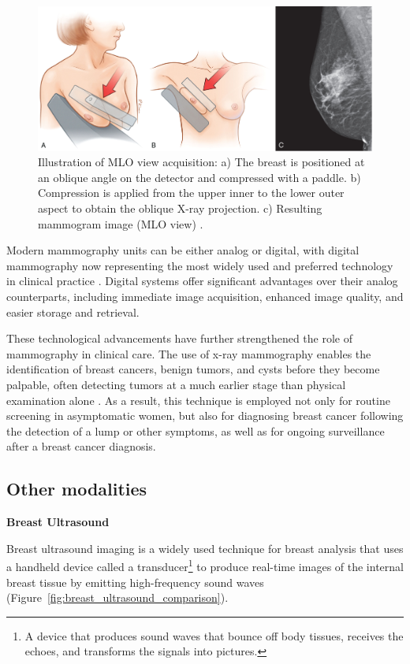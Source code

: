 \documentclass[a4paper,10pt]{book}
\begin{document}
\begin{figure}[h!]
    \centering
    \includegraphics[width=0.6\linewidth]{reports//assets/mlo_view.jpg}
    \caption[MLO view acquisition procedure]{Illustration of MLO view acquisition: a) The breast is positioned at an oblique angle on the detector and compressed with a paddle. b) Compression is applied from the upper inner to the lower outer aspect to obtain the oblique X-ray projection. c) Resulting mammogram image (MLO view) \cite{imaging_introduction_2022}.}
    \label{fig:mlo_view}
\end{figure}


Modern mammography units can be either analog or digital, with digital mammography now representing the most widely used and preferred technology in clinical practice \cite{ltd_mammography_2025, noauthor_mammography_nodate}. Digital systems offer significant advantages over their analog counterparts, including immediate image acquisition, enhanced image quality, and easier storage and retrieval.

These technological advancements have further strengthened the role of mammography in clinical care. The use of x-ray mammography enables the identification of breast cancers, benign tumors, and cysts before they become palpable, often detecting tumors at a much earlier stage than physical examination alone \cite{staff_what_2025}. As a result, this technique is employed not only for routine screening in asymptomatic women, but also for diagnosing breast cancer following the detection of a lump or other symptoms, as well as for ongoing surveillance after a breast cancer diagnosis.

\subsection{Other modalities}

\textbf{Breast Ultrasound}

Breast ultrasound imaging is a widely used technique for breast analysis that uses a handheld device called a transducer\footnote{A device that produces sound waves that bounce off body tissues, receives the echoes, and transforms the signals into pictures.} to produce real-time images of the internal breast tissue by emitting high-frequency sound waves (Figure~\ref{fig:breast_ultrasound_comparison}).
\end{document}
